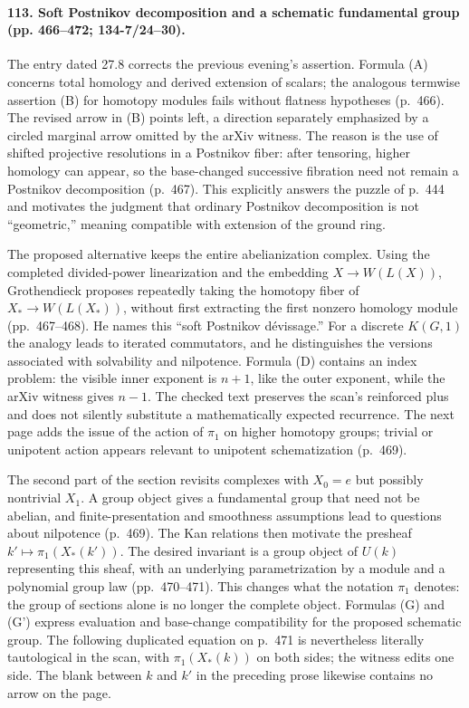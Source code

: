 \paragraph{113. Soft Postnikov decomposition and a schematic fundamental group (pp. 466--472; 134-7/24--30).}
The entry dated 27.8 corrects the previous evening's assertion. Formula (A) concerns total homology and derived extension of scalars; the analogous termwise assertion (B) for homotopy modules fails without flatness hypotheses (p.~466). The revised arrow in (B) points left, a direction separately emphasized by a circled marginal arrow omitted by the arXiv witness. The reason is the use of shifted projective resolutions in a Postnikov fiber: after tensoring, higher homology can appear, so the base-changed successive fibration need not remain a Postnikov decomposition (p.~467). This explicitly answers the puzzle of p.~444 and motivates the judgment that ordinary Postnikov decomposition is not ``geometric,'' meaning compatible with extension of the ground ring.

The proposed alternative keeps the entire abelianization complex. Using the completed divided-power linearization and the embedding $X\to W(L(X))$, Grothendieck proposes repeatedly taking the homotopy fiber of $X_*\to W(L(X_*))$, without first extracting the first nonzero homology module (pp.~467--468). He names this ``soft Postnikov d\'evissage.'' For a discrete $K(G,1)$ the analogy leads to iterated commutators, and he distinguishes the versions associated with solvability and nilpotence. Formula (D) contains an index problem: the visible inner exponent is $n+1$, like the outer exponent, while the arXiv witness gives $n-1$. The checked text preserves the scan's reinforced plus and does not silently substitute a mathematically expected recurrence. The next page adds the issue of the action of $\pi_1$ on higher homotopy groups; trivial or unipotent action appears relevant to unipotent schematization (p.~469).

The second part of the section revisits complexes with $X_0=e$ but possibly nontrivial $X_1$. A group object gives a fundamental group that need not be abelian, and finite-presentation and smoothness assumptions lead to questions about nilpotence (p.~469). The Kan relations then motivate the presheaf $k'\mapsto\pi_1(X_*(k'))$. The desired invariant is a group object of $U(k)$ representing this sheaf, with an underlying parametrization by a module and a polynomial group law (pp.~470--471). This changes what the notation $\pi_1$ denotes: the group of sections alone is no longer the complete object. Formulas (G) and (G') express evaluation and base-change compatibility for the proposed schematic group. The following duplicated equation on p.~471 is nevertheless literally tautological in the scan, with $\pi_1(X_*(k))$ on both sides; the witness edits one side. The blank between $k$ and $k'$ in the preceding prose likewise contains no arrow on the page.

